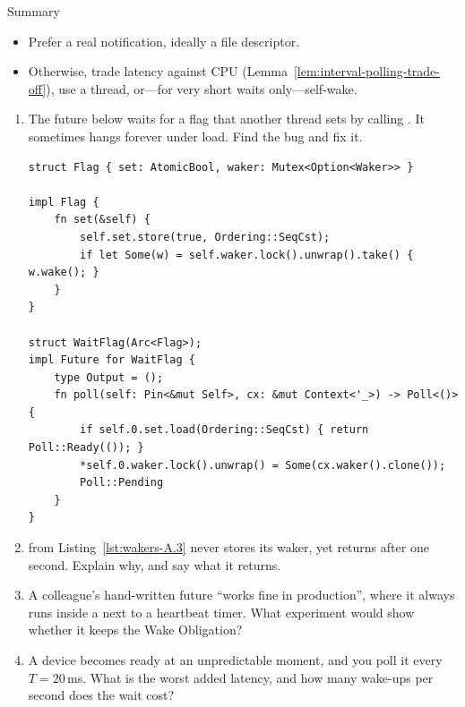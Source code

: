 \begin{quotebox}{Summary}
    \begin{itemize}
        \item Prefer a real notification, ideally a file descriptor.
        \item Otherwise, trade latency against CPU (Lemma~\ref{lem:interval-polling-trade-off}), use a thread, or---for very short waits only---self-wake.
    \end{itemize}
\end{quotebox}

\begin{Exercise}[title={Keeping the Wake Obligation}]
    \begin{enumerate}
        \item The future below waits for a flag that another thread sets by calling . It sometimes hangs forever under load. Find the bug and fix it.
\begin{lstlisting}
struct Flag { set: AtomicBool, waker: Mutex<Option<Waker>> }

impl Flag {
    fn set(&self) {
        self.set.store(true, Ordering::SeqCst);
        if let Some(w) = self.waker.lock().unwrap().take() { w.wake(); }
    }
}

struct WaitFlag(Arc<Flag>);
impl Future for WaitFlag {
    type Output = ();
    fn poll(self: Pin<&mut Self>, cx: &mut Context<'_>) -> Poll<()> {
        if self.0.set.load(Ordering::SeqCst) { return Poll::Ready(()); }
        *self.0.waker.lock().unwrap() = Some(cx.waker().clone());
        Poll::Pending
    }
}
\end{lstlisting}
        \item {} from Listing~\ref{lst:wakers-A.3} never stores its waker, yet  returns after one second. Explain why, and say what it returns.
        \item A colleague's hand-written future ``works fine in production'', where it always runs inside a  next to a heartbeat timer. What experiment would show whether it keeps the Wake Obligation?
        \item A device becomes ready at an unpredictable moment, and you poll it every $T = 20$\,ms. What is the worst added latency, and how many wake-ups per second does the wait cost?
    \end{enumerate}
\end{Exercise}
